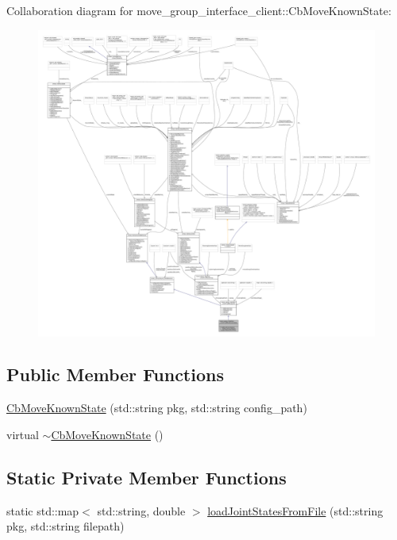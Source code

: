 Collaboration diagram for move\+\_\+group\+\_\+interface\+\_\+client\+:\+:Cb\+Move\+Known\+State\+:
\nopagebreak
\begin{figure}[H]
\begin{center}
\leavevmode
\includegraphics[width=350pt]{classmove__group__interface__client_1_1CbMoveKnownState__coll__graph}
\end{center}
\end{figure}
\subsection*{Public Member Functions}
\begin{DoxyCompactItemize}
\item 
\hyperlink{classmove__group__interface__client_1_1CbMoveKnownState_a40ec0e13fe77943e15ab83b5d7aca7ac}{Cb\+Move\+Known\+State} (std\+::string pkg, std\+::string config\+\_\+path)
\item 
virtual \hyperlink{classmove__group__interface__client_1_1CbMoveKnownState_a0c7364140835c3b99b98a1a78ba20680}{$\sim$\+Cb\+Move\+Known\+State} ()
\end{DoxyCompactItemize}
\subsection*{Static Private Member Functions}
\begin{DoxyCompactItemize}
\item 
static std\+::map$<$ std\+::string, double $>$ \hyperlink{classmove__group__interface__client_1_1CbMoveKnownState_af00c5ee81dfa5dd0817135279df09d74}{load\+Joint\+States\+From\+File} (std\+::string pkg, std\+::string filepath)
\end{DoxyCompactItemize}
